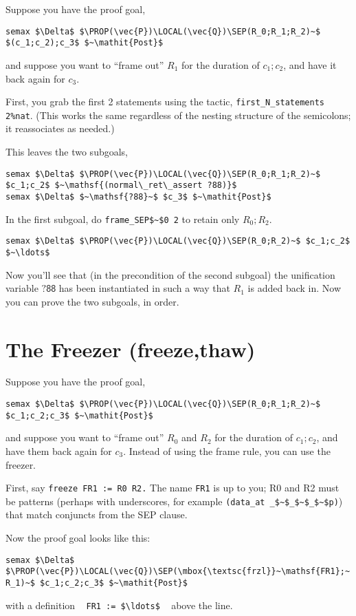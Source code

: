 \documentclass[12pt,fleqn,openany,oneside,showtrims]{memoir}
\newcommand{\ychapter}[2]{\chapter[#1]{#1}}
\begin{document}
Suppose you have the proof goal,
\begin{lstlisting}
semax $\Delta$ $\PROP(\vec{P})\LOCAL(\vec{Q})\SEP(R_0;R_1;R_2)~$ $(c_1;c_2);c_3$ $~\mathit{Post}$
\end{lstlisting}
and suppose you want to ``frame out'' $R_1$ for the duration of
$c_1;c_2$, and have it back again for $c_3$.

First, you grab the first 2 statements using the tactic, \newline
\lstinline{first_N_statements 2%nat}.  (This works the same regardless of the
  nesting structure of the semicolons; it reassociates as needed.)

This leaves the two subgoals,
\begin{lstlisting}
semax $\Delta$ $\PROP(\vec{P})\LOCAL(\vec{Q})\SEP(R_0;R_1;R_2)~$ $c_1;c_2$ $~\mathsf{(normal\_ret\_assert ?88)}$
semax $\Delta$ $~\mathsf{?88}~$ $c_3$ $~\mathit{Post}$
\end{lstlisting}

In the first subgoal, do \lstinline{frame_SEP$~$0 2} to retain only $R_0;R_2$.
\begin{lstlisting}
semax $\Delta$ $\PROP(\vec{P})\LOCAL(\vec{Q})\SEP(R_0;R_2)~$ $c_1;c_2$ $~\ldots$
\end{lstlisting}
Now you'll see that (in the precondition of the second subgoal)
the unification variable $\mathsf{?88}$ has been
instantiated in such a way that $R_1$ is added back in.
Now you can prove the two subgoals, in order.


\ychapter{The Freezer (\textsf{freeze,thaw})}{}
\label{freezer}
Suppose you have the proof goal,
\begin{lstlisting}
semax $\Delta$ $\PROP(\vec{P})\LOCAL(\vec{Q})\SEP(R_0;R_1;R_2)~$ $c_1;c_2;c_3$ $~\mathit{Post}$
\end{lstlisting}
and suppose you want to ``frame out'' $R_0$ and $R_2$ for the duration of
$c_1;c_2$, and have them back again for $c_3$.
Instead of using the frame rule, you can use the freezer.

First, say \lstinline{freeze FR1 := R0 R2.}\newline
The name \lstinline{FR1} is up to you; R0 and R2 must be patterns
(perhaps with underscores,
for example \lstinline{(data_at _$~$_$~$_$~$p)}) 
that match conjuncts from the SEP clause.

Now the proof goal looks like this:
\begin{lstlisting}
semax $\Delta$ $\PROP(\vec{P})\LOCAL(\vec{Q})\SEP(\mbox{\textsc{frzl}}~\mathsf{FR1};~ R_1)~$ $c_1;c_2;c_3$ $~\mathit{Post}$\end{lstlisting}
with a definition ~ \lstinline{FR1 := $\ldots$} ~ above the line.
\end{document}
